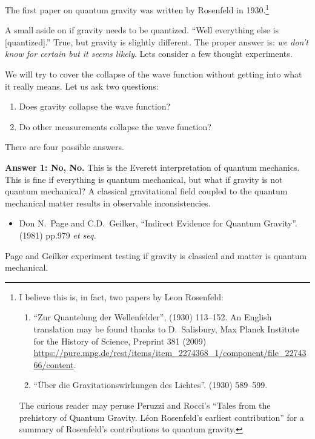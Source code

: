 \lecture

The first paper on quantum gravity was written by Rosenfeld in
1930.\footnote{I believe this is, in fact, two papers by Leon Rosenfeld:
\begin{enumerate}
\item ``Zur Quantelung der Wellenfelder'',
  (1930) 113--152. An English translation
may be found thanks to D.~Salisbury, Max Planck
Institute for the History of Science, Preprint 381 (2009) \url{https://pure.mpg.de/rest/items/item_2274368_1/component/file_2274366/content}.
\item ``\"{U}ber die Gravitationswirkungen des Lichtes''.   (1930) 589--599.
\end{enumerate}
The curious reader may peruse Peruzzi and Rocci's ``Tales from the prehistory of Quantum Gravity. L\'eon Rosenfeld's earliest contribution''  for a summary of
Rosenfeld's contributions to quantum gravity.}

A small aside on if gravity needs to be quantized. ``Well everything
else is [quantized].'' True, but gravity is slightly different. The
proper answer is: \emph{we don't know for certain but it seems
likely}. Lets consider a few thought experiments.

We will try to cover the collapse of the wave function without getting
into what it really means. Let us ask two questions:
\begin{enumerate}
\item Does gravity collapse the wave function?
\item Do other measurements collapse the wave function?
\end{enumerate}
There are four possible answers.

\bigbreak\noindent\textbf{Answer 1: No, No.}  This is the Everett
interpretation of quantum mechanics. This is fine if everything is
quantum mechanical, but what if gravity is not quantum mechanical? A
classical gravitational field coupled to the quantum mechanical matter
results in observable inconsistencies.

\begin{itemize}
\item Don N.~Page and C.D.~Geilker,
``Indirect Evidence for Quantum Gravity''.
  (1981) pp.979 \emph{et seq.}
\end{itemize}
Page and Geilker experiment testing if gravity is classical and matter
is quantum mechanical.

